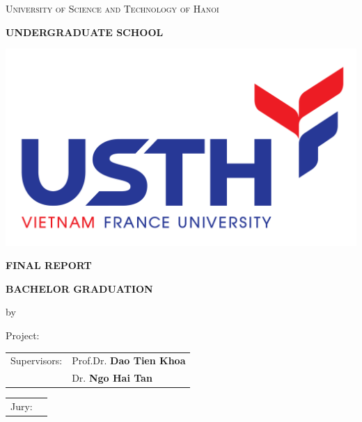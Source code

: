 \documentclass[a4paper,12pt]{article}
\theoremstyle{plain}\newtheorem{ques}{Question}
\theoremstyle{definition}\newtheorem*{ans}{Answer}
\begin{document}
        \begin{boxedminipage}[t]{14.8cm}
            \thispagestyle{empty}
            \centering
            {\scshape\large University of Science and Technology of Hanoi \par}
            {\large\bfseries \MakeUppercase{Undergraduate School} \par}
            \vspace{0.5cm}
            {\includegraphics[scale=0.08,valign=c]{logo/USTH_logo.png}\par}
            \vspace{0.5cm}
            {\Large\bfseries\MakeUppercase{Final Report}\par}
            {\LARGE\bfseries\MakeUppercase{Bachelor Graduation}\par}
            \vspace{0.4cm}
            {\large by\par}
            \vspace{0.3cm}
            {\Large\bfseries \theauthor\par}
            \vspace{1.5cm}
            {\Large Project:\par}
            {\huge \MakeUppercase{\thetitle}\par}
            \vspace{2cm}
            {\Large
            \begin{tabular}{p{3cm} p{7cm}}
                Supervisors: & Prof.Dr. \textbf{Dao Tien Khoa}\\
                             & Dr. \textbf{Ngo Hai Tan}
            \end{tabular}
            }
            \vspace{1cm}
            {\Large
            \begin{tabular}{p{3cm} p{7cm}}
                Jury: & 
            \end{tabular}
            }
            \vfill
            {\large\par}
        \end{boxedminipage}
        
\end{document}
